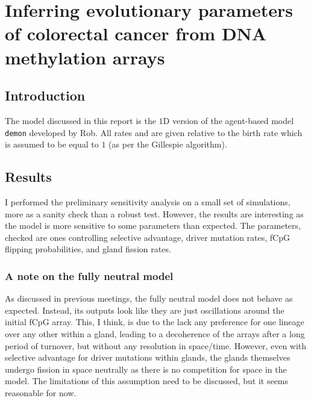 \chapter{Inferring evolutionary parameters of colorectal cancer from DNA methylation arrays}\label{methchap}
\section{Introduction}
The model discussed in this report is the $1$D version of the agent-based model \texttt{demon} developed by Rob. All rates and are given relative to the birth rate which is assumed to be equal to $1$ (as per the Gillespie algorithm).
\section{Results}
I performed the preliminary sensitivity analysis on a small set of simulations, more as a sanity check than a robust test. However, the results are interesting as the model is more sensitive to some parameters than expected. The parameters, checked are ones controlling selective advantage, driver mutation rates, fCpG flipping probabilities, and gland fission rates.
\subsection{A note on the fully neutral model}
As discussed in previous meetings, the fully neutral model does not behave as expected. Instead, its outputs look like they are just oscillations around the initial fCpG array. This, I think, is due to the lack any preference for one lineage over any other within a gland, leading to a decoherence of the arrays after a long period of turnover, but without any resolution in space/time. However, even with selective advantage for driver mutations within glands, the glands themselves undergo fission in space neutrally as there is no competition for space in the model. The limitations of this assumption need to be discussed, but it seems reasonable for now.

